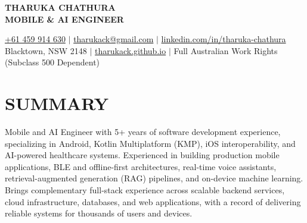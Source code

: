 \documentclass[letterpaper,11pt]{article}
\begin{document}
\begin{center}
    {\Huge \textbf{THARUKA CHATHURA}} \\ \vspace{4pt}
    {\large \textbf{MOBILE \& AI ENGINEER}} \\ \vspace{6pt}

    \small
    \href{tel:+61459914630}{+61 459 914 630}
    \hspace{5pt} $|$ \hspace{5pt}
    \href{mailto:tharukack@gmail.com}{tharukack@gmail.com}
    \hspace{5pt} $|$ \hspace{5pt}
    \href{https://www.linkedin.com/in/tharuka-chathura/}{linkedin.com/in/tharuka-chathura}
    \\ \vspace{3pt}
    Blacktown, NSW 2148
    \hspace{5pt} $|$ \hspace{5pt}
    \href{https://tharukack.github.io/}{tharukack.github.io}
    \hspace{5pt} $|$ \hspace{5pt}
    Full Australian Work Rights (Subclass 500 Dependent)
\end{center}

\vspace{-8pt}

\section{SUMMARY}
\small{
Mobile and AI Engineer with 5+ years of software development experience, specializing in Android, Kotlin Multiplatform (KMP), iOS interoperability, and AI-powered healthcare systems. Experienced in building production mobile applications, BLE and offline-first architectures, real-time voice assistants, retrieval-augmented generation (RAG) pipelines, and on-device machine learning. Brings complementary full-stack experience across scalable backend services, cloud infrastructure, databases, and web applications, with a record of delivering reliable systems for thousands of users and devices.
}

\vspace{-6pt}

\end{document}
